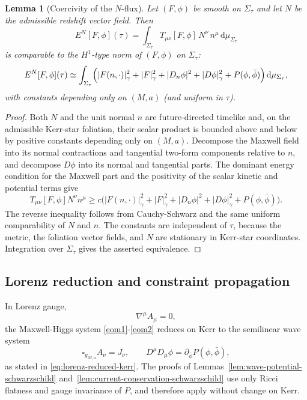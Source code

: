 \documentclass[11pt]{article}
\numberwithin{equation}{section}
\theoremstyle{plain}
\newtheorem{lemma}[theorem]{Lemma}
\theoremstyle{definition}
\theoremstyle{remark}
\newcommand{\dd}{\mathrm{d}}
\begin{document}
\begin{lemma}[Coercivity of the $N$-flux]\label{lem:N-coercive-kerr}
Let $(F,\phi)$ be smooth on $\Sigma_\tau$ and let $N$ be the admissible redshift vector field.
Then
\begin{equation}
E^{N}[F,\phi](\tau)
=
\int_{\Sigma_\tau} T_{\mu\nu}[F,\phi]\,N^\nu\,n^\mu\,\dd\mu_{\Sigma_\tau}
\end{equation}
is comparable to the $H^1$-type norm of $(F,\phi)$ on $\Sigma_\tau$:
\begin{equation}
E^{N}[F,\phi](\tau)
\simeq
\int_{\Sigma_\tau}
\Bigl(
|F(n,\cdot)|_\gamma^{2}+|F|_\gamma^{2}
+|D_n\phi|^{2}+|D\phi|_\gamma^{2}+P(\phi,\bar\phi)
\Bigr)\,\dd\mu_{\Sigma_\tau},
\end{equation}
with constants depending only on $(M,a)$ (and uniform in $\tau$).
\end{lemma}


\begin{proof}
Both \(N\) and the unit normal \(n\) are future-directed timelike and, on the admissible Kerr-star foliation, their scalar product is bounded above and below by positive constants depending only on \((M,a)\).  Decompose the Maxwell field into its normal contractions and tangential two-form components relative to \(n\), and decompose \(D\phi\) into its normal and tangential parts.  The dominant energy condition for the Maxwell part and the positivity of the scalar kinetic and potential terms give
\[
 T_{\mu\nu}[F,\phi]N^\nu n^\mu
 \ge c\bigl(|F(n,\cdot)|_\gamma^2+|F|_\gamma^2+|D_n\phi|^2+|D\phi|_\gamma^2+P(\phi,\bar\phi)\bigr).
\]
The reverse inequality follows from Cauchy-Schwarz and the same uniform comparability of \(N\) and \(n\).  The constants are independent of \(\tau\), because the metric, the foliation vector fields, and \(N\) are stationary in Kerr-star coordinates.  Integration over \(\Sigma_\tau\) gives the asserted equivalence.
\end{proof}

\subsection{Lorenz reduction and constraint propagation}\label{app:kerr-lorenz}

In Lorenz gauge,
\begin{equation}\label{eq:app-lorenz}
\nabla^{\mu}A_{\mu}=0,
\end{equation}
the Maxwell-Higgs system \eqref{eom1}-\eqref{eom2} reduces on Kerr to the semilinear wave system
\begin{equation}\label{eq:app-lorenz-reduced-kerr}
\square_{g_{M,a}}A_{\nu}=J_{\nu},
\qquad
D^{\mu}D_{\mu}\phi=\partial_{\bar\phi}P(\phi,\bar\phi),
\end{equation}
as stated in \eqref{eq:lorenz-reduced-kerr}.
The proofs of Lemmas~\ref{lem:wave-potential-schwarzschild} and~\ref{lem:current-conservation-schwarzschild}
use only Ricci flatness and gauge invariance of $P$, and therefore apply without change on Kerr.
\end{document}
